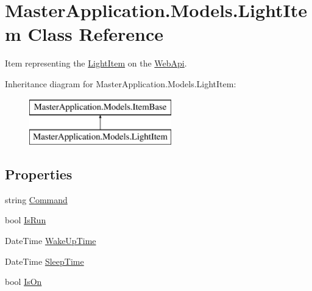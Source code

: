 \hypertarget{class_master_application_1_1_models_1_1_light_item}{}\section{Master\+Application.\+Models.\+Light\+Item Class Reference}
\label{class_master_application_1_1_models_1_1_light_item}


Item representing the \mbox{\hyperlink{class_master_application_1_1_models_1_1_light_item}{Light\+Item}} on the \mbox{\hyperlink{namespace_web_api}{Web\+Api}}.  


Inheritance diagram for Master\+Application.\+Models.\+Light\+Item\+:\begin{figure}[H]
\begin{center}
\leavevmode
\includegraphics[height=2.000000cm]{class_master_application_1_1_models_1_1_light_item}
\end{center}
\end{figure}
\subsection*{Properties}
\begin{DoxyCompactItemize}
\item 
string \mbox{\hyperlink{class_master_application_1_1_models_1_1_light_item_aca9f889d7bfc4c5557fe7ba166e97016}{Command}}
\item 
bool \mbox{\hyperlink{class_master_application_1_1_models_1_1_light_item_acb310ef6e997b04050e0ebf218deb04c}{Is\+Run}}
\item 
Date\+Time \mbox{\hyperlink{class_master_application_1_1_models_1_1_light_item_a422d731371ffffe3ac8d2d2ba35f550a}{Wake\+Up\+Time}}
\item 
Date\+Time \mbox{\hyperlink{class_master_application_1_1_models_1_1_light_item_a84358948ee252dd0d98f42c1c882bb45}{Sleep\+Time}}
\item 
bool \mbox{\hyperlink{class_master_application_1_1_models_1_1_light_item_af5fbd61949dec3cbac725f72cafeae49}{Is\+On}}
\end{DoxyCompactItemize}
